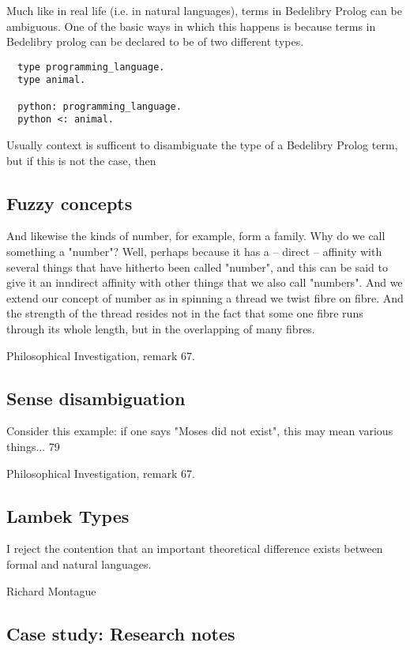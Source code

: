 \documentclass{book}
\begin{document}
Much like in real life (i.e. in natural languages), terms in Bedelibry Prolog can be ambiguous. One of the basic ways in which this happens is because terms in Bedelibry prolog can be declared to be of two different types.

\begin{verbatim}
  type programming_language.
  type animal.

  python: programming_language.
  python <: animal.
\end{verbatim}

\noindent Usually context is sufficent to disambiguate the type of a Bedelibry Prolog term, but if this is not the case, then 

\subsection{Fuzzy concepts}

\epigraph{And likewise the kinds of number, for example, form a family. Why do we call something a "number"? Well, perhaps because it has a -- direct -- affinity with several things that have hitherto been called "number", and this can be said to give it an inndirect affinity with other things that we also call "numbers". And we extend our concept of number as in spinning a thread we twist fibre on fibre. And the strength of the thread resides not in the fact that some one fibre runs through its whole length, but in the overlapping of many fibres.}{Philosophical Investigation, remark 67.}

\subsection{Sense disambiguation}

\epigraph{Consider this example: if one says "Moses did not exist", this may mean various things... 79}{Philosophical Investigation, remark 67.}

\subsection{Lambek Types}

\epigraph{I reject the contention that an important theoretical difference exists between formal and natural languages.}{Richard Montague}

\subsection{Case study: Research notes}
\end{document}
